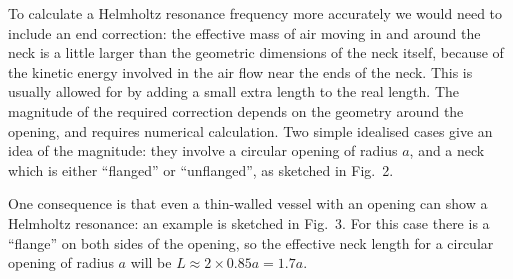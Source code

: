   To calculate a Helmholtz resonance frequency more accurately we would need to 
  include an end correction: the effective mass of air moving in and around the 
  neck is a little larger than the geometric dimensions of the neck itself, 
  because of the kinetic energy involved in the air flow near the ends of the 
  neck. This is usually allowed for by adding a small extra length to the real 
  length. The magnitude of the required correction depends on the geometry 
  around the opening, and requires numerical calculation. Two simple idealised 
  cases give an idea of the magnitude: they involve a circular opening of 
  radius $a$, and a neck which is either ``flanged'' or ``unflanged'', as 
  sketched in Fig.\ 2. 

  One consequence is that even a thin-walled vessel with an opening can show a 
  Helmholtz resonance: an example is sketched in Fig.\ 3. For this case there 
  is a ``flange'' on both sides of the opening, so the effective neck length 
  for a circular opening of radius $a$ will be $L \approx 2 \times 0.85 a=1.7 
  a$. 